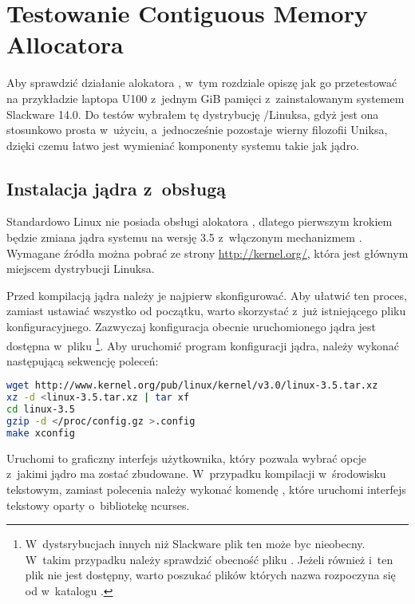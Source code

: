 \chapter{Testowanie Contiguous Memory Allocatora}

Aby sprawdzić działanie alokatora , w~tym rozdziale opiszę
jak go przetestować na przykładzie laptopa  U100 z~jednym
\unit{GiB} pamięci  z~zainstalowanym systemem Slackware 14.0.
Do testów wybrałem tę dystrybucję /Linuksa, gdyż jest ona
stosunkowo prosta w~użyciu, a~jednocześnie pozostaje wierny filozofii
Uniksa, dzięki czemu łatwo jest wymieniać komponenty systemu takie jak
jądro.


\section{Instalacja jądra z~obsługą }

Standardowo Linux nie posiada obsługi alokatora , dlatego
pierwszym krokiem będzie zmiana jądra systemu na wersję 3.5
z~włączonym mechanizmem .  Wymagane źródła można pobrać ze
strony \url{http://kernel.org/}, która jest głównym miejscem
dystrybucji Linuksa.

Przed kompilacją jądra należy je najpierw skonfigurować.  Aby ułatwić
ten proces, zamiast ustawiać wszystko od początku, warto skorzystać
z~już istniejącego pliku konfiguracyjnego.  Zazwyczaj konfiguracja
obecnie uruchomionego jądra jest dostępna w~pliku
\footnote{W~dystsrybucjach innych niż Slackware
  plik ten może byc nieobecny.  W~takim przypadku należy sprawdzić
  obecność pliku .  Jeżeli również i~ten plik nie
  jest dostępny, warto poszukać plików których nazwa rozpoczyna się od
   w~katalogu .}.  Aby uruchomić program
konfiguracji jądra, należy wykonać następującą sekwencję poleceń:

\begin{lstlisting}[language=sh,numbers=none]
wget http://www.kernel.org/pub/linux/kernel/v3.0/linux-3.5.tar.xz
xz -d <linux-3.5.tar.xz | tar xf
cd linux-3.5
gzip -d </proc/config.gz >.config
make xconfig
\end{lstlisting}

Uruchomi to graficzny interfejs użytkownika, który pozwala wybrać
opcje z~jakimi jądro ma zostać zbudowane.  W~przypadku kompilacji
w~środowisku tekstowym, zamiast polecenia  należy
wykonać komendę , które uruchomi interfejs
tekstowy oparty o~bibliotekę ncurses.

